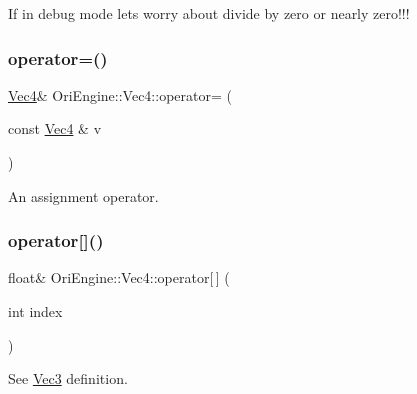 If in debug mode let\textquotesingle{}s worry about divide by zero or nearly zero!!! \hypertarget{struct_ori_engine_1_1_vec4_a47afc3fac3c12536ef2fd980fb822ff6}{}\label{struct_ori_engine_1_1_vec4_a47afc3fac3c12536ef2fd980fb822ff6} 
\subsubsection{\texorpdfstring{operator=()}{operator=()}}
{\footnotesize\ttfamily \hyperlink{struct_ori_engine_1_1_vec4}{Vec4}\& Ori\+Engine\+::\+Vec4\+::operator= (\begin{DoxyParamCaption}\item[{const \hyperlink{struct_ori_engine_1_1_vec4}{Vec4} \&}]{v }\end{DoxyParamCaption})\hspace{0.3cm}{\ttfamily [inline]}}



An assignment operator. 

\hypertarget{struct_ori_engine_1_1_vec4_a8b078fddd99fc65f2a54a08948c56879}{}\label{struct_ori_engine_1_1_vec4_a8b078fddd99fc65f2a54a08948c56879} 
\subsubsection{\texorpdfstring{operator[]()}{operator[]()}\hspace{0.1cm}{\footnotesize\ttfamily [1/2]}}
{\footnotesize\ttfamily float\& Ori\+Engine\+::\+Vec4\+::operator\mbox{[}$\,$\mbox{]} (\begin{DoxyParamCaption}\item[{int}]{index }\end{DoxyParamCaption})\hspace{0.3cm}{\ttfamily [inline]}}



See \hyperlink{struct_ori_engine_1_1_vec3}{Vec3} definition. 

\hypertarget{struct_ori_engine_1_1_vec4_a5c5dea0b9eba3a118dbedf5ec57f3caf}{}\label{struct_ori_engine_1_1_vec4_a5c5dea0b9eba3a118dbedf5ec57f3caf} 
